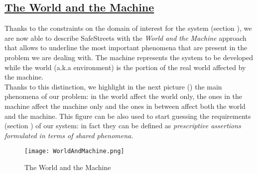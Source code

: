 \subsection[The World and the Machine]{\hyperlink{toc}{The World and the Machine}}
	\label{sec:worldMachine}
	Thanks to the constraints on the domain of interest for the system (section ), we are now able to describe SafeStreets with the \textit{World and the Machine} approach that allows to underline the most important phenomena that are present in the problem we are dealing with. The machine represents the system to be developed while the world (a.k.a environment) is the portion of the real world affected by the machine.\\
	
	Thanks to this distinction, we highlight in the next picture () the main phenomena of our problem:  in the world affect the world only, the ones in the machine affect the machine only and the ones in between affect both the world and the machine. This figure can be also used to start guessing the requirements (section ) of our system: in fact they can be defined as \textit{prescriptive assertions formulated in terms of shared phenomena.}
	\vspace{1cm} 
	
	\begin{figure}[h]
		\centering
		\texttt{[image: WorldAndMachine.png]}
		\caption{\label{fig:worldAndMachine}The World and the Machine}
	\end{figure}
 	 